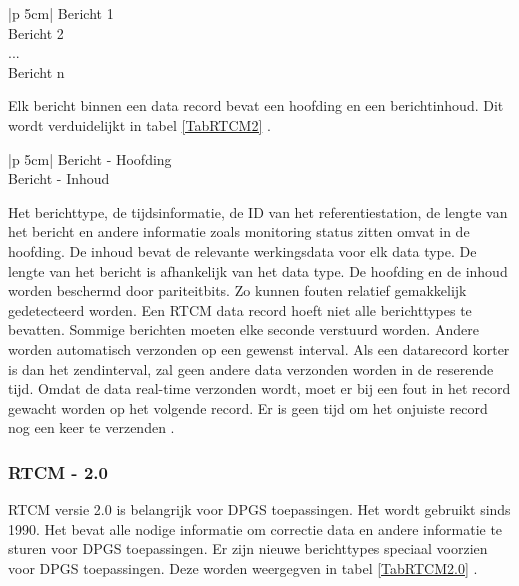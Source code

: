 \begin{table}[hbp]
	\caption{RTCM record, verdeeld in verschillende berichttypes}	
	\centering	
	\begin{tabular}{|p {5cm}|}	
		\hline
		Bericht 1 \\ \hline
		Bericht 2 \\ \hline
		... \\ \hline
		Bericht n \\ \hline
	\end{tabular}
	\label{TabRTCMBer}
\end{table}

Elk bericht binnen een data record bevat een hoofding en een berichtinhoud. Dit wordt verduidelijkt in tabel \ref{TabRTCM2} \cite{LBibRTCM3}.

\begin{table}[hbp]
	\caption{RTCM bericht, verdeeld in hoofding en bericht}	
	\centering	
	\begin{tabular}{|p {5cm}|}	
		\hline
		Bericht - Hoofding \\ \hline
		Bericht - Inhoud \\ \hline
	\end{tabular}
	\label{TabRTCM2}
\end{table}

Het berichttype, de tijdsinformatie, de ID van het referentiestation, de lengte van het bericht en andere informatie zoals monitoring status zitten omvat in de hoofding. De inhoud bevat de relevante werkingsdata voor elk data type. De lengte van het bericht is afhankelijk van het data type. De hoofding en de inhoud worden beschermd door pariteitbits. Zo kunnen fouten relatief gemakkelijk gedetecteerd worden. Een RTCM data record hoeft niet alle berichttypes te bevatten. Sommige berichten moeten elke seconde verstuurd worden. Andere worden automatisch verzonden op een gewenst interval. Als een datarecord korter is dan het zendinterval, zal geen andere data verzonden worden in de reserende tijd. Omdat de data real-time verzonden wordt, moet er bij een fout in het record gewacht worden op het volgende record. Er is geen tijd om het onjuiste record nog een keer te verzenden \cite{LBibRTCM3}. 

\subsubsection{RTCM - 2.0}
RTCM versie 2.0 is belangrijk voor DPGS toepassingen. Het wordt gebruikt sinds 1990. Het bevat alle nodige informatie om correctie data en andere informatie te sturen voor DPGS toepassingen. Er zijn nieuwe berichttypes speciaal voorzien voor DPGS toepassingen. Deze worden weergegven in tabel \ref{TabRTCM2.0} \cite{LBibRTCM3}.

